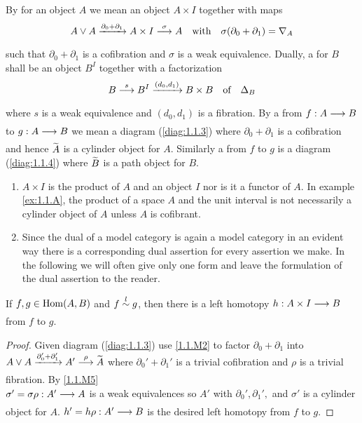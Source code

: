 \documentclass[../main]{subfiles}
\begin{document}
\begin{definition}\label{def:1.1.4}
	By  for an object $A$ we mean an object $A\times I$ together with maps 
	\[A\vee A \varrightarrow{\partial_0+\partial_1}A\times I\varrightarrow{\sigma} A \quad \text{with}\quad \sigma(\partial_0+\partial_1)=\nabla_A\]
	such that $\partial_0+\partial_1$ is a cofibration and $\sigma$ is a weak equivalence. Dually, a  for $B$ shall be an object $B^I$ together with a factorization 
	\[B\varrightarrow{s}B^I\varrightarrow{(d_0,d_1)}B\times B\quad \text{of}\quad \Delta_B\]
	where $s$ is a weak equivalence and $(d_0,d_1)$ is a fibration. By a  from $f:A\varrightarrow{}B$ to $g:A\varrightarrow{}B$ we mean a diagram (\ref{diag:1.1.3}) where $\partial_0+\partial_1$ is a cofibration and hence $\xtilde{A}$ is a cylinder object for $A$. Similarly a  from $f$ to $g$ is a diagram (\ref{diag:1.1.4}) where $\xtilde{B}$ is a path object for $B$.
\end{definition}

\begin{remark*}
	\begin{enumerate}[label= \arabic*.]
		\item $A\times I$ is  the product of $A$ and an object $I$ nor is it a functor of $A$. In example \ref{ex:1.1.A}, the product of a space $A$ and the unit interval is not necessarily a cylinder object of $A$ unless $A$ is cofibrant.
		\item Since the dual of a model category is again a model category in an evident way there is a corresponding dual assertion for every assertion we make. In the following we will often give only one form and leave the formulation of the dual assertion to the reader.
	\end{enumerate}
\end{remark*}

\begin{lemma}\label{lem:1.1.1}
	If $f,g\in \operatorname{Hom}(A,B)$ and $f\overset{l}{\sim} g$, then there is a left homotopy $h:A\times I\varrightarrow{} B$ from $f$ to $g$.
\end{lemma}

\begin{proof}
	Given diagram (\ref{diag:1.1.3}) use \ref{1.1.M2} to factor $\partial_0+\partial_1$ into $A\vee A \varrightarrow{\partial_0'+\partial_1'} A' \varrightarrow{\rho} \xtilde{A}$ where $\partial_0'+\partial_1'$ is a trivial cofibration and $\rho$ is a trivial fibration. By \ref{1.1.M5} \\ $\sigma'=\sigma \rho:A'\varrightarrow{}A$ is a weak equivalences so $A'$ with $\partial_0',\partial_1',$ and $\sigma'$ is a cylinder object for $A$. $h'=h\rho:A'\varrightarrow{}B$ is the desired left homotopy from $f$ to $g$.
\end{proof}
\end{document}
